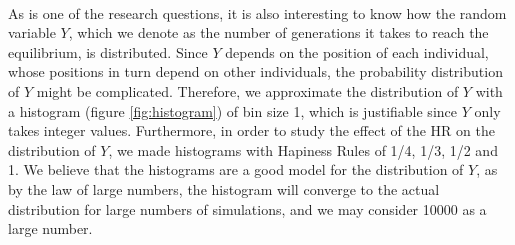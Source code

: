 \\
As is one of the research questions, it is also interesting to know how the random variable $Y$, which we denote as the number of generations it takes to reach the equilibrium, is distributed. Since $Y$ depends on the position of each individual, whose positions in turn depend on other individuals, the probability distribution of $Y$ might be complicated. Therefore, we approximate the distribution of $Y$ with a histogram (figure \ref{fig:histogram}) of bin size 1, which is justifiable since $Y$ only takes integer values. Furthermore, in order to study the effect of the HR on the distribution of $Y$, we made histograms with Hapiness Rules of 1/4, 1/3, 1/2 and 1.  We believe that the histograms are a good model for the distribution of $Y$, as by the law of large numbers, the histogram will converge to the actual distribution for large numbers of simulations, and we may consider 10000 as a large number.\\
\\
 
